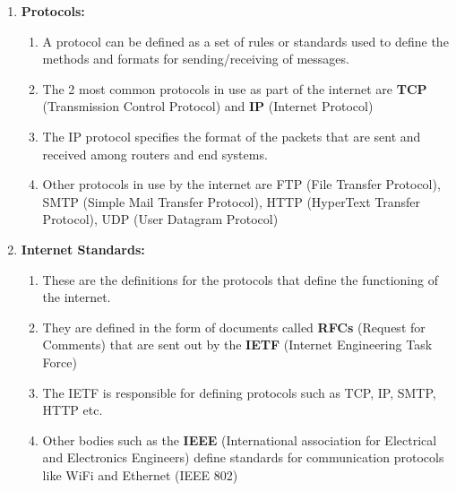 \documentclass{article}
\theoremstyle{plain}
\theoremstyle{definition}
\begin{document}
\begin{enumerate}
    \item \textbf{Protocols:}
    \begin{enumerate}
        \item A protocol can be defined as a set of rules or standards used to define the methods and formats for sending/receiving of messages.
        
        \item The 2 most common protocols in use as part of the internet are \textbf{TCP} (Transmission Control Protocol) and \textbf{IP} (Internet Protocol)
        
        \item The IP protocol specifies the format of the packets that are sent and received among routers and end systems.
        
        \item Other protocols in use by the internet are FTP (File Transfer Protocol), SMTP (Simple Mail Transfer Protocol), HTTP (HyperText Transfer Protocol), UDP (User Datagram Protocol)
    \end{enumerate}
    
    \item \textbf{Internet Standards:} 
    \begin{enumerate}
        \item These are the definitions for the protocols that define the functioning of the internet.
        
        \item They are defined in the form of documents called \textbf{RFCs} (Request for Comments) that are sent out by the \textbf{IETF} (Internet Engineering Task Force) 
        
        \item The IETF is responsible for defining protocols such as TCP, IP, SMTP, HTTP etc.
        
        \item Other bodies such as the \textbf{IEEE} (International association for Electrical and Electronics Engineers) define standards for communication protocols like WiFi and Ethernet (IEEE 802)
    \end{enumerate}
\end{enumerate}
\end{document}
